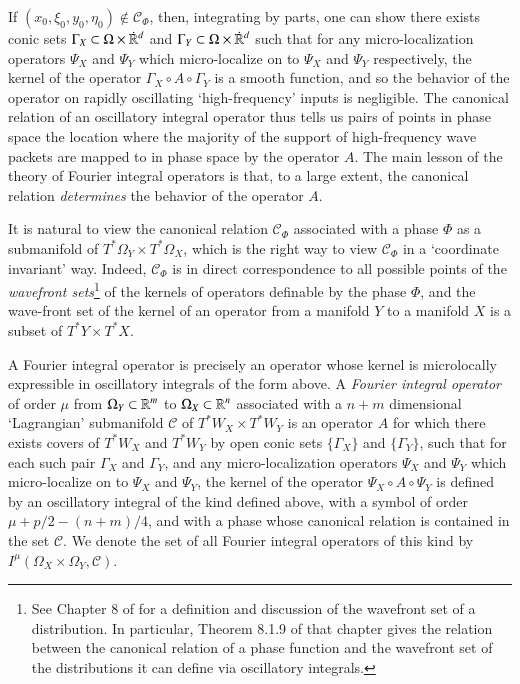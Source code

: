 If $(x_0,\xi_0,y_0,\eta_0) \not \in \mathcal{C}_\Phi$, then, integrating by parts, one can show there exists conic sets $\Gamma_X \subset {\Omega} \times {\dot{\RR}{\vphantom{\RR}}^d}$ and $\Gamma_Y \subset {\Omega} \times {{\dot{\RR}{\vphantom{\RR}}^d}}$ such that for any micro-localization operators $\Psi_X$ and $\Psi_Y$ which micro-localize on to $\Psi_X$ and $\Psi_Y$ respectively, the kernel of the operator $\Gamma_X \circ A \circ \Gamma_Y$ is a smooth function, and so the behavior of the operator on rapidly oscillating `high-frequency' inputs is negligible. The canonical relation of an oscillatory integral operator thus tells us pairs of points in phase space the location where the majority of the support of high-frequency wave packets are mapped to in phase space by the operator $A$. The main lesson of the theory of Fourier integral operators is that, to a large extent, the canonical relation \emph{determines} the behavior of the operator $A$.

It is natural to view the canonical relation $\mathcal{C}_\Phi$ associated with a phase $\Phi$ as a submanifold of $T^* \Omega_Y \times T^* \Omega_X$, which is the right way to view $\mathcal{C}_\Phi$ in a `coordinate invariant' way. Indeed, $\mathcal{C}_\Phi$ is in direct correspondence to all possible points of the  \emph{wavefront sets}\footnote{See Chapter 8 of \cite{HormanderVol1} for a definition and discussion of the wavefront set of a distribution. In particular, Theorem 8.1.9 of that chapter gives the relation between the canonical relation of a phase function and the wavefront set of the distributions it can define via oscillatory integrals.} of the kernels of operators definable by the phase $\Phi$, and the wave-front set of the kernel of an operator from a manifold $Y$ to a manifold $X$ is a subset of $T^* Y \times T^* X$.

A Fourier integral operator is precisely an operator whose kernel is microlocally expressible in oscillatory integrals of the form above. A \emph{Fourier integral operator} of order $\mu$ from $\Omega_Y \subset \operatorname{\mathbb{R}}^m$ to $\Omega_X \subset \operatorname{\mathbb{R}}^n$ associated with a $n + m$ dimensional `Lagrangian' submanifold $\mathcal{C}$ of $T^* W_X \times T^* W_Y$ is an operator $A$ for which there exists covers of $T^* W_X$ and $T^* W_Y$ by open conic sets $\{ \Gamma_X \}$ and $\{ \Gamma_Y \}$, such that for each such pair $\Gamma_X$ and $\Gamma_Y$, and any micro-localization operators $\Psi_X$ and $\Psi_Y$ which micro-localize on to $\Psi_X$ and $\Psi_Y$, the kernel of the operator $\Psi_X \circ A \circ \Psi_Y$ is defined by an oscillatory integral of the kind defined above, with a symbol of order $\mu + p/2 - (n+m)/4$, and with a phase whose canonical relation is contained in the set $\mathcal{C}$. We denote the set of all Fourier integral operators of this kind by $I^\mu(\Omega_X \times \Omega_Y,\mathcal{C})$.

